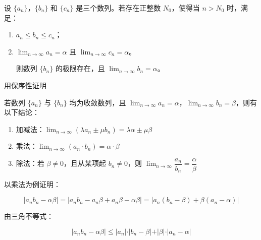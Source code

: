 \begin{theorem}[夹逼准则]

设 $\displaystyle \lbrace a_n \rbrace$，$\displaystyle \lbrace b_n \rbrace$ 和 $\displaystyle \lbrace c_n \rbrace$ 是三个数列。若存在正整数 $\displaystyle N_0$，使得当 $\displaystyle n > N_0$ 时，满足：

\begin{enumerate}
  \item {$\displaystyle a_n \le b_n \le c_n$；

}\item {$\displaystyle \lim_{n \to \infty} a_n = {\alpha}$ 且 $\displaystyle \lim_{n \to \infty} c_n = {\alpha}$。

则数列 $\displaystyle \lbrace b_n \rbrace$ 的极限存在，且 $\displaystyle \lim_{n \to \infty} b_n = {\alpha}$。

}
\end{enumerate}

\end{theorem}

用保序性证明

\begin{corollary}[数列极限的四则运算法则]

若数列 $\displaystyle \lbrace a_n \rbrace$ 与 $\displaystyle \lbrace b_n \rbrace$ 均为收敛数列，且 $\displaystyle \lim_{n \to \infty} a_n = {\alpha}$，$\displaystyle \lim_{n \to \infty} b_n = \beta$，则有以下结论：

\begin{enumerate}
  \item {加减法：$\displaystyle \lim_{n \to \infty} (\lambda a_n \pm \mu b_n) = \lambda{\alpha} \pm \mu\beta$}\item {乘法：$\displaystyle \lim_{n \to \infty} (a_n \cdot b_n) = {\alpha} \cdot \beta$}\item {除法：若 $\displaystyle \beta \ne 0$，且从某项起 $\displaystyle b_n \ne 0$，则 $\displaystyle \lim_{n \to \infty} \dfrac{a_n}{b_n} = \dfrac{{\alpha}}{\beta}$}
\end{enumerate}

\end{corollary}

以乘法为例证明：

$$
\displaystyle \vert a_n b_n - {\alpha}\beta \vert = \vert a_n b_n - a_n \beta + a_n \beta - {\alpha}\beta \vert = \vert a_n(b_n - \beta) + \beta(a_n - {\alpha}) \vert
$$

由三角不等式：

$$
\displaystyle \vert a_n b_n - {\alpha}\beta \vert \le \vert a_n \vert \cdot \vert b_n - \beta \vert + \vert \beta \vert \cdot \vert a_n - {\alpha} \vert
$$

